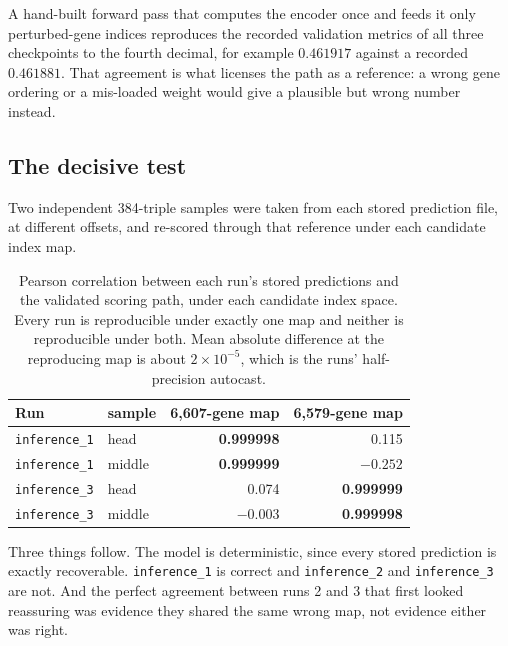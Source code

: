 A hand-built forward pass that computes the encoder once and feeds it only
perturbed-gene indices reproduces the recorded validation metrics of all three
checkpoints to the fourth decimal, for example $0.461917$ against a recorded
$0.461881$. That agreement is what licenses the path as a reference: a wrong gene
ordering or a mis-loaded weight would give a plausible but wrong number instead.

\subsection{The decisive test}

Two independent 384-triple samples were taken from each stored prediction file,
at different offsets, and re-scored through that reference under each candidate
index map.

\begin{table}[htbp]
\centering
\begin{tabular}{llrr}
\hline
Run & sample & 6{,}607-gene map & 6{,}579-gene map \\
\hline
\texttt{inference\_1} & head & \textbf{0.999998} & 0.115 \\
\texttt{inference\_1} & middle & \textbf{0.999999} & $-0.252$ \\
\texttt{inference\_3} & head & 0.074 & \textbf{0.999999} \\
\texttt{inference\_3} & middle & $-0.003$ & \textbf{0.999998} \\
\hline
\end{tabular}
\caption{Pearson correlation between each run's stored predictions and the
validated scoring path, under each candidate index space. Every run is
reproducible under exactly one map and neither is reproducible under both. Mean
absolute difference at the reproducing map is about $2 \times 10^{-5}$, which is
the runs' half-precision autocast.}
\label{tab:indextest}
\end{table}

Three things follow. The model is deterministic, since every stored prediction is
exactly recoverable. \texttt{inference\_1} is correct and
\texttt{inference\_2} and \texttt{inference\_3} are not. And the perfect agreement
between runs 2 and 3 that first looked reassuring was evidence they shared the
same wrong map, not evidence either was right.

